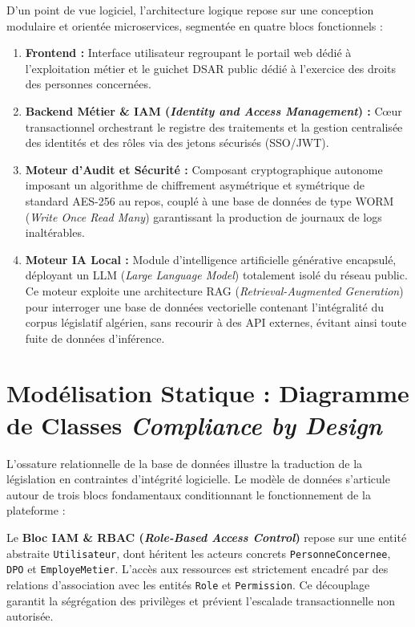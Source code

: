 D'un point de vue logiciel, l'architecture logique repose sur une conception modulaire et orientée microservices, segmentée en quatre blocs fonctionnels :
\begin{enumerate}
    \item \textbf{Frontend :} Interface utilisateur regroupant le portail web dédié à l'exploitation métier et le guichet DSAR public dédié à l'exercice des droits des personnes concernées.
    \item \textbf{Backend Métier \& IAM (\textit{Identity and Access Management}) :} Cœur transactionnel orchestrant le registre des traitements et la gestion centralisée des identités et des rôles via des jetons sécurisés (SSO/JWT).
    \item \textbf{Moteur d'Audit et Sécurité :} Composant cryptographique autonome imposant un algorithme de chiffrement asymétrique et symétrique de standard AES-256 au repos, couplé à une base de données de type WORM (\textit{Write Once Read Many}) garantissant la production de journaux de logs inaltérables.
    \item \textbf{Moteur IA Local :} Module d'intelligence artificielle générative encapsulé, déployant un LLM (\textit{Large Language Model}) totalement isolé du réseau public. Ce moteur exploite une architecture RAG (\textit{Retrieval-Augmented Generation}) pour interroger une base de données vectorielle contenant l'intégralité du corpus législatif algérien, sans recourir à des API externes, évitant ainsi toute fuite de données d'inférence.
\end{enumerate}

\section{Modélisation Statique : Diagramme de Classes \textit{Compliance by Design}}
L'ossature relationnelle de la base de données illustre la traduction de la législation en contraintes d'intégrité logicielle. Le modèle de données s'articule autour de trois blocs fondamentaux conditionnant le fonctionnement de la plateforme :

Le \textbf{Bloc IAM \& RBAC (\textit{Role-Based Access Control})} repose sur une entité abstraite \texttt{Utilisateur}, dont héritent les acteurs concrets \texttt{PersonneConcernee}, \texttt{DPO} et \texttt{EmployeMetier}. L'accès aux ressources est strictement encadré par des relations d'association avec les entités \texttt{Role} et \texttt{Permission}. Ce découplage garantit la ségrégation des privilèges et prévient l'escalade transactionnelle non autorisée.

